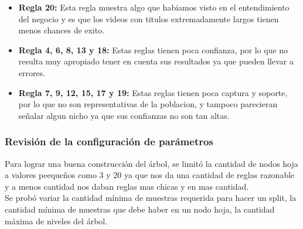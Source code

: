 \begin{itemize}
\begin{itemize}
                    \item \textbf{Regla 20:} Esta regla muestra algo que
                    habiamos visto en el entendimiento del negocio y es que los
                    videos con titulos extremadamente largos tienen menos
                    chances de exito.

                    \item \textbf{Regla 4, 6, 8, 13 y 18:} Estas reglas tienen
                    poca confianza, por lo que no resulta muy apropiado tener
                    en cuenta sus resultados ya que pueden llevar a errores.

                    \item \textbf{Regla 7, 9, 12, 15, 17 y 19:} Estas reglas
                    tienen poca captura y soporte, por lo que no son
                    representativas de la poblacion, y tampoco parecieran
                    señalar algun nicho ya que sus confianzas no son tan altas.

                \end{itemize}
            \end{itemize}

    \subsubsection{Revisión de la configuración de parámetros}
        Para lograr una buena construcción del árbol, se limitó la cantidad de
        nodos hoja a valores peequeños como 3 y 20 ya que nos da una cantidad
        de reglas razonable y a menos cantidad nos daban reglas mas chicas y
        en mas cantidad.\\
        Se probó variar la cantidad mínima de muestras requerida para hacer
        un split, la cantidad mínima de muestras que debe haber en un nodo
        hoja, la cantidad máxima de niveles del árbol.


